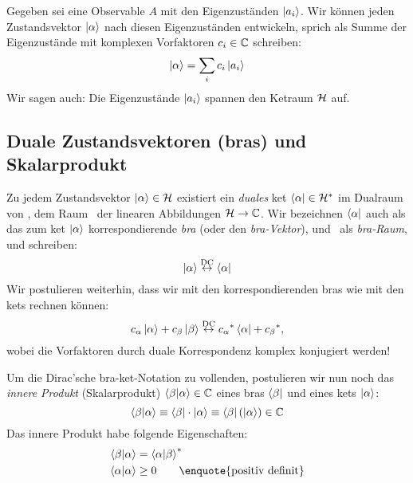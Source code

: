 \begin{post}
 Gegeben sei eine Observable $A$ mit den Eigenzust\"anden $\ket{a_i}$. Wir k\"onnen jeden Zustandsvektor $\ket{\alpha}$ nach diesen Eigenzust\"anden entwickeln, sprich als Summe der Eigenzust\"ande mit komplexen Vorfaktoren $c_i \in \mathbb{C}$ schreiben:
\begin{equation}
 \ket{\alpha} = \sum_i c_i \ket{a_i}
\end{equation}
Wir sagen auch: Die Eigenzust\"ande $\ket{a_i}$ spannen den Ketraum $\mathcal{H}$ auf.
\end{post}

\subsection{Duale Zustandsvektoren (bras) und Skalarprodukt}
\begin{post}
 Zu jedem Zustandsvektor $\ket{\alpha} \in \mathcal{H}$ existiert ein \emph{duales} ket $\bra{\alpha} \in {\ensuremath{\mathcal{H}}}^*$ im Dualraum von \hs, dem Raum \ds{\hs}\ der linearen Abbildungen $\mathcal{H} \rightarrow \mathbb{C}$. Wir bezeichnen $\bra{\alpha}$ auch als das zum ket $\ket{\alpha}$ korrespondierende \emph{bra} (oder den \emph{bra-Vektor}), und \ds{\hs}\ als \emph{bra-Raum}, und schreiben:
\begin{equation}
 \ket{\alpha} \overset{\text{DC}}{\leftrightarrow} \bra{\alpha}
\end{equation}
 Wir postulieren weiterhin, dass wir mit den korrespondierenden bras wie mit den kets rechnen k\"onnen:
\begin{equation}
 c_{\alpha} \ket{\alpha} + c_{\beta} \ket{\beta} \overset{\text{DC}}{\leftrightarrow} {c_{\alpha}}^* \bra{\alpha} + {c_{\beta}}^* ,
\end{equation}
wobei die Vorfaktoren durch duale Korrespondenz komplex konjugiert werden!
\end{post}

\begin{post}
 Um die Dirac'sche bra-ket-Notation zu vollenden, postulieren wir nun noch das \emph{innere Produkt} (Skalarprodukt) $\braket{\beta | \alpha} \in \mathbb{C}$ eines bras $\bra{\beta}$ und eines kets $\ket{\alpha}$:
\begin{equation}
 \braket{\beta | \alpha} \equiv \bra{\beta} \cdot \ket{\alpha} \equiv \bra{\beta} ( \ket{\alpha} ) \in \mathbb{C}
\end{equation}
Das innere Produkt habe folgende Eigenschaften:
\begin{align}
 \braket{\beta | \alpha} &= \cc{\braket{\alpha | \beta}} \\
\braket{\alpha | \alpha} &\geq 0 \qquad \text{\enquote{positiv definit}} 
\end{align}

\end{post}
 
